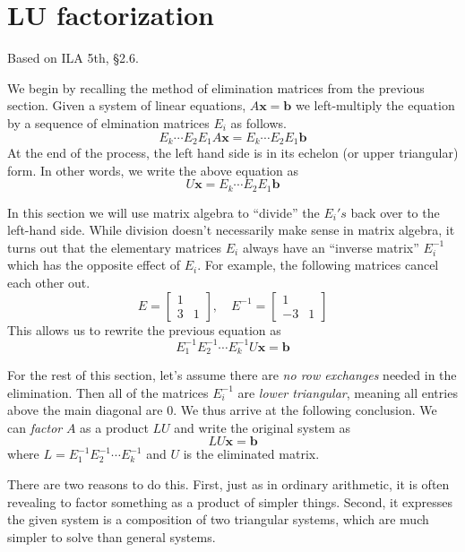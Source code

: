 \documentclass[11pt,oneside]{amsbook}
\theoremstyle{definition}
\theoremstyle{plain}
\theoremstyle{definition}
\theoremstyle{remark}
\numberwithin{equation}{section}
\numberwithin{figure}{section}
\begin{document}
\newpage
\section{LU factorization}

Based on ILA 5th, \S 2.6.

We begin by recalling the method of elimination matrices from the previous section. Given a system of linear equations, $A\mathbf{x}=\mathbf{b}$ we left-multiply the equation by a sequence of elmination matrices $E_i$ as follows.
\[E_k\cdots E_2E_1A\mathbf{x}=E_k\cdots E_2E_1\mathbf{b}
\]
At the end of the process, the left hand side is in its echelon (or upper triangular) form. In other words, we write the above equation as
\[U\mathbf{x}=E_k\cdots E_2E_1\mathbf{b}
\]

In this section we will use matrix algebra to ``divide'' the $E_i's$ back over to the left-hand side. While division doesn't necessarily make sense in matrix algebra, it turns out that the elementary matrices $E_i$ always have an ``inverse matrix'' $E_i^{-1}$ which has the opposite effect of $E_i$. For example, the following matrices cancel each other out.
\[E=\begin{bmatrix}1\\3&1\end{bmatrix},\quad
  E^{-1}=\begin{bmatrix}1\\-3&1\end{bmatrix}
\]
This allows us to rewrite the previous equation as
\[E_1^{-1}E_2^{-1}\cdots E_k^{-1}U\mathbf{x}=\mathbf{b}
\]

For the rest of this section, let's assume there are \emph{no row exchanges} needed in the elimination. Then all of the matrices $E_i^{-1}$ are \emph{lower triangular}, meaning all entries above the main diagonal are $0$. We thus arrive at the following conclusion. We can \emph{factor} $A$ as a product $LU$ and write the original system as
\[LU\mathbf{x}=\mathbf{b}
\]
where $L=E_1^{-1}E_2^{-1}\cdots E_k^{-1}$ and $U$ is the eliminated matrix.

There are two reasons to do this. First, just as in ordinary arithmetic, it is often revealing to factor something as a product of simpler things. Second, it expresses the given system is a composition of two triangular systems, which are much simpler to solve than general systems.
\end{document}
